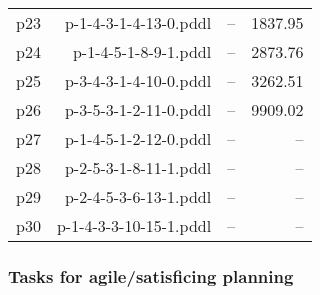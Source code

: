 \documentclass{article}
\begin{document}
\begin{center}
\begin{tabular}{@{}l|r|r|r@{}}
  p23& p-1-4-3-1-4-13-0.pddl&--&1837.95\\
  p24& p-1-4-5-1-8-9-1.pddl&--&2873.76\\
  p25& p-3-4-3-1-4-10-0.pddl&--&3262.51\\
  p26& p-3-5-3-1-2-11-0.pddl&--&9909.02\\
  p27& p-1-4-5-1-2-12-0.pddl&--&--\\
  p28& p-2-5-3-1-8-11-1.pddl&--&--\\
  p29& p-2-4-5-3-6-13-1.pddl&--&--\\
  p30& p-1-4-3-3-10-15-1.pddl&--&--
                            \end{tabular}
                            \end{center}
                    

                    \subsubsection*{Tasks for agile/satisficing planning}
                    
\end{document}

